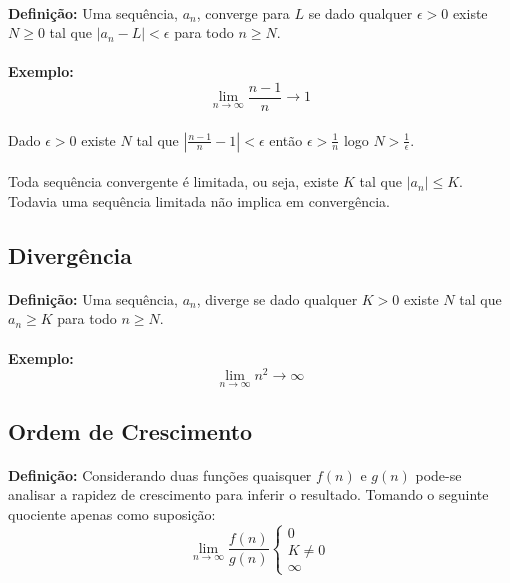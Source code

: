 \documentclass{article}
\begin{document}
        \paragraph{}\textbf{Definição:} Uma sequência, $a_{n}$, converge para $L$ se dado qualquer $\epsilon > 0$ existe $N \ge 0$ tal que $|a_{n}-L|<\epsilon$ para todo $n \ge N$.
        \paragraph{}\textbf{Exemplo:}
            \[\lim_{n\to\infty}\frac{n-1}{n}\rightarrow1\]
        \paragraph{}Dado $\epsilon>0$ existe $N$ tal que $|\frac{n-1}{n}-1|<\epsilon$ então $\epsilon>\frac{1}{n}$ logo $N>\frac{1}{\epsilon}$.
        \paragraph{} Toda sequência convergente é limitada, ou seja, existe $K$ tal que $|a_{n}| \le K$. Todavia uma sequência limitada não implica em convergência.
    
    \subsection{Divergência}
        \paragraph{}\textbf{Definição:} Uma sequência, $a_{n}$, diverge se dado qualquer $K>0$ existe $N$ tal que $a_{n} \ge K$ para todo $n \ge N$.
        \paragraph{}\textbf{Exemplo:} 
            \[\lim_{n\to\infty}n^{2} \rightarrow \infty\]
    
    \subsection{Ordem de Crescimento}
        \paragraph{}\textbf{Definição:} Considerando duas funções quaisquer $f(n)$ e $g(n)$ pode-se analisar a rapidez de crescimento para inferir o resultado. Tomando o seguinte quociente apenas como suposição:
            \[\lim\limits_{n\to\infty}\frac{f(n)}{g(n)}\left \{ \begin{matrix} 0\\ K\ne0\\ \infty\end{matrix}\right.\]
\end{document}
